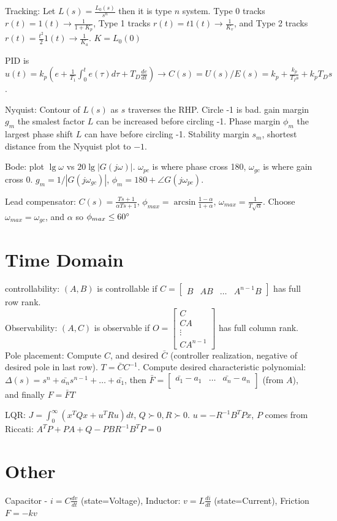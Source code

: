 \documentclass[11pt]{article}
\begin{document}
Tracking: Let $L(s) = \frac{L_0(s)}{s^n}$ then it is type $n$ system. Type 0 tracks $r(t) = 1(t) \to \frac{1}{1 + K_p}$,
Type 1 tracks $r(t) = t1(t) \to \frac{1}{K_v}$, and Type 2 tracks $r(t) = \frac{t^2}{2}1(t) \to \frac{1}{K_a}$.
$K = L_0(0)$

PID is $u(t) = k_p (e + \frac{1}{T_1}\int_0^t e(\tau) d\tau + T_D \frac{de}{dt}) \to C(s) = U(s)/E(s) = k_p + \frac{k_p}{T_Is} + k_p T_D s$.

Nyquist: Contour of $L(s)$ as $s$ traverses the RHP. Circle -1 is bad.
gain margin $g_m$ the smalest factor $L$ can be increased before circling -1.
Phase margin $\phi_m$ the largest phase shift $L$ can have before circling -1.
Stability margin $s_m$, shortest distance from the Nyquist plot to $-1$.

Bode: plot $\lg \omega$ vs $20 \lg |G(j\omega)|$. $\omega_{pc}$ is where phase cross 180,
$\omega_{gc}$ is where gain cross 0. $g_m = 1/|G(j\omega_{gc})|$, $\phi_m = 180 + \angle G(j\omega_{pc})$.

Lead compensator: $C(s) = \frac{Ts + 1}{\alpha T s + 1}$, $\phi_{max} = \arcsin \frac{1 - \alpha}{1 + \alpha}$, $\omega_{max} = \frac{1}{T\sqrt{\alpha}}$.
Choose $\omega_{max} = \omega_{gc}$, and $\alpha$ so $\phi_{max} \leq 60\degree$

\section{Time Domain}
controllability: $(A,B)$ is controllable if $C = \begin{bmatrix}
    B & AB & \dots & A^{n-1}B
\end{bmatrix}$ has full row rank.\\
Observability: $(A,C)$ is observable if $O = \begin{bmatrix}
    C \\ CA \\ \vdots \\ CA^{n-1}
\end{bmatrix}$ has full column rank.\\

Pole placement: Compute $C$, and desired $\bar{C}$ (controller realization, negative of desired pole in last row).
$T = \bar{C}C^{-1}$. Compute desired characteristic polynomial: $\Delta(s) = s^n + \bar{a_n}s^{n-1} + \dots + \bar{a_1}$,
then $\bar{F} = \begin{bmatrix}
    \bar{a_1} - a_1 & \dots & \bar{a_n} - a_n \\
\end{bmatrix}$ (from $A$), and finally $F = \bar{F}T$

LQR: $J = \int_0^\infty (x^T Q x + u^T R u) dt$, $Q \succ 0, R \succ 0$. $u = -R^{-1}B^T Px$, $P$ comes from Riccati: $A^T P + PA + Q - PBR^{-1}B^TP = 0$
\section{Other}

Capacitor - $i = C \frac{dv}{dt}$ (state=Voltage), Inductor: $v = L \frac{di}{dt}$ (state=Current), Friction $F = -k v$
\end{document}
